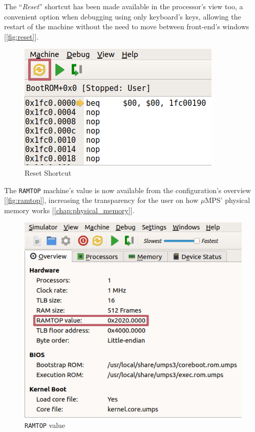\documentclass[12pt,a4paper,openright,twoside]{report}
\begin{document}
\clearpage
The ``\textit{Reset}'' shortcut has been made available in the processor's view too, a convenient option when debugging using only keyboard's keys, allowing the restart of the machine without the need to move between front-end's windows [\autoref{fig:reset}].
\begin{figure}[h]
	\centering
	\includegraphics[scale=0.7]{reset}
	\caption{Reset Shortcut}
	\label{fig:reset}
\end{figure}

The \texttt{RAMTOP} machine's value is now available from the configuration's overview [\autoref{fig:ramtop}], increasing the transparency for the user on how $\mu$MPS' physical memory works [\autoref{chap:physical_memory}].
\begin{figure}[h]
	\centering
	\includegraphics[scale=0.72]{ramtop}
	\caption{\texttt{RAMTOP} value}
	\label{fig:ramtop}
\end{figure}
\end{document}
